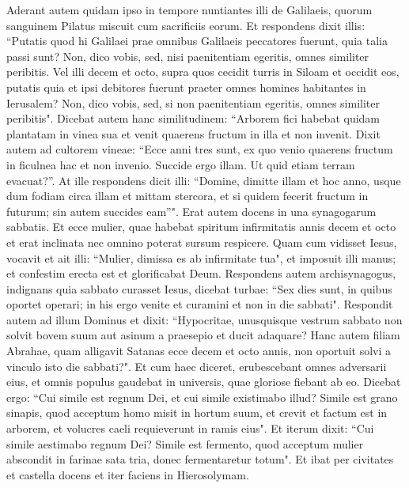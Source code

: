 \begin{biblechapter}  
\verse Aderant autem quidam ipso in tempore nuntiantes illi de Galilaeis, quorum sanguinem Pilatus miscuit cum sacrificiis eorum. 
\verse Et respondens dixit illis: “Putatis quod hi Galilaei prae omnibus Galilaeis peccatores fuerunt, quia talia passi sunt? 
\verse Non, dico vobis, sed, nisi paenitentiam egeritis, omnes similiter peribitis. 
\verse Vel illi decem et octo, supra quos cecidit turris in Siloam et occidit eos, putatis quia et ipsi debitores fuerunt praeter omnes homines habitantes in Ierusalem? 
\verse Non, dico vobis, sed, si non paenitentiam egeritis, omnes similiter peribitis". 
\verse Dicebat autem hanc similitudinem: “Arborem fici habebat quidam plantatam in vinea sua et venit quaerens fructum in illa et non invenit. 
\verse Dixit autem ad cultorem vineae: “Ecce anni tres sunt, ex quo venio quaerens fructum in ficulnea hac et non invenio. Succide ergo illam. Ut quid etiam terram evacuat?”. 
\verse At ille respondens dicit illi: “Domine, dimitte illam et hoc anno, usque dum fodiam circa illam et mittam stercora, 
\verse et si quidem fecerit fructum in futurum; sin autem succides eam”". 
\verse Erat autem docens in una synagogarum sabbatis. 
\verse Et ecce mulier, quae habebat spiritum infirmitatis annis decem et octo et erat inclinata nec omnino poterat sursum respicere. 
\verse Quam cum vidisset Iesus, vocavit et ait illi: “Mulier, dimissa es ab infirmitate tua", 
\verse et imposuit illi manus; et confestim erecta est et glorificabat Deum. 
\verse Respondens autem archisynagogus, indignans quia sabbato curasset Iesus, dicebat turbae: “Sex dies sunt, in quibus oportet operari; in his ergo venite et curamini et non in die sabbati". 
\verse Respondit autem ad illum Dominus et dixit: “Hypocritae, unusquisque vestrum sabbato non solvit bovem suum aut asinum a praesepio et ducit adaquare? 
\verse Hanc autem filiam Abrahae, quam alligavit Satanas ecce decem et octo annis, non oportuit solvi a vinculo isto die sabbati?". 
\verse Et cum haec diceret, erubescebant omnes adversarii eius, et omnis populus gaudebat in universis, quae gloriose fiebant ab eo. 
\verse Dicebat ergo: “Cui simile est regnum Dei, et cui simile existimabo illud? 
\verse Simile est grano sinapis, quod acceptum homo misit in hortum suum, et crevit et factum est in arborem, et volucres caeli requieverunt in ramis eius". 
\verse Et iterum dixit: “Cui simile aestimabo regnum Dei? 
\verse Simile est fermento, quod acceptum mulier abscondit in farinae sata tria, donec fermentaretur totum". 
\verse Et ibat per civitates et castella docens et iter faciens in Hierosolymam.  

\end{biblechapter}
